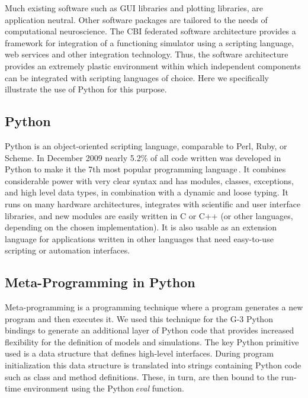\documentclass[12pt]{article}
\begin{document}
Much existing software such as GUI libraries and plotting
libraries, are application neutral.  Other software packages are
tailored to the needs of computational neuroscience.  The CBI federated
software architecture provides a framework for integration of a functioning
simulator using a scripting language, web services and other
integration technology.  Thus, the software architecture provides
an extremely plastic environment within which independent components can
be integrated with scripting languages of choice.  Here we
specifically illustrate the use of Python for this purpose.

\subsection{Python}

Python is an object-oriented scripting language, comparable to Perl,
Ruby, or Scheme.  In December 2009 nearly 5.2\% of all code written was
developed in Python to make it the 7th most popular programming
language\,\cite{software09:_tiobe_progr_commun_index}. It combines
considerable power with very clear syntax and has modules, classes,
exceptions, and high level data types, in combination with a dynamic
and loose typing. It runs on many hardware architectures, integrates
with scientific and user interface libraries, and new modules are
easily written in C or C++ (or other languages, depending on the
chosen implementation). It is also usable as an extension language for
applications written in other languages that need easy-to-use
scripting or automation interfaces.


\subsection{Meta-Programming in Python}

Meta-programming is a programming technique where a program generates
a new program and then executes it.  We used this technique for the G-3
Python bindings to generate an additional layer of Python code that
provides increased flexibility for the definition of models and
simulations.  The key Python primitive used is a data structure that
defines high-level interfaces.  During program initialization this
data structure is translated into strings containing Python code such as
class and method definitions. These, in turn, are then bound to the run-time
environment using the Python\,{\it eval} function.
\end{document}
